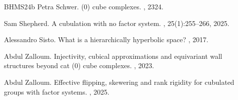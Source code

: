 \documentclass{amsart}
\theoremstyle{definition}
\theoremstyle{remark}
\theoremstyle{definition}
\begin{document}
\begin{thebibliography}{BHMS24b}
Petra Schwer.
(0) cube complexes.
, 2324.

Sam Shepherd.
\newblock A cubulation with no factor system.
, 25(1):255--266, 2025.

Alessandro Sisto.
\newblock What is a hierarchically hyperbolic space?
, 2017.

Abdul Zalloum.
\newblock Injectivity, cubical approximations and equivariant wall structures
  beyond cat (0) cube complexes.
, 2023.

Abdul Zalloum.
\newblock Effective flipping, skewering and rank rigidity for cubulated groups
  with factor systems.
, 2025.

\end{thebibliography}


 
\end{document}
